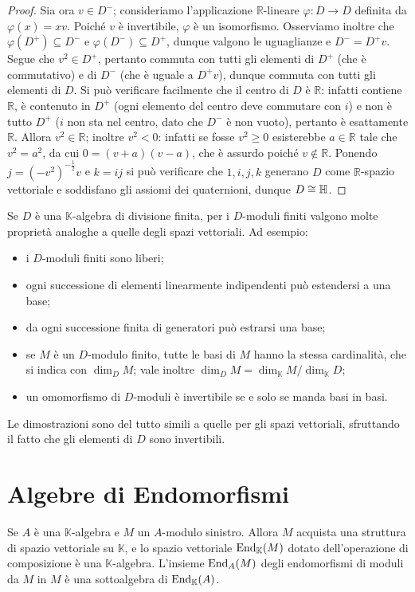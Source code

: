 \begin{proof}
Sia ora $v\in D^-$; consideriamo l'applicazione $\mathbb{R}$-lineare $\varphi:D\to D$ definita da $\varphi(x)=xv$. Poiché $v$ è invertibile, $\varphi$ è un isomorfismo. Osserviamo inoltre che $\varphi(D^+)\subseteq D^-$ e $\varphi(D^-)\subseteq D^+$, dunque valgono le uguaglianze e $D^-=D^+v$. Segue che $v^2\in D^+$, pertanto commuta con tutti gli elementi di $D^+$ (che è commutativo) e di $D^-$ (che è uguale a $D^+v$), dunque commuta con tutti gli elementi di $D$. Si può verificare facilmente che il centro di $D$ è $\mathbb{R}$: infatti contiene $\mathbb{R}$, è contenuto in $D^+$ (ogni elemento del centro deve commutare con $i$) e non è tutto $D^+$ ($i$ non sta nel centro, dato che $D^-$ è non vuoto), pertanto è esattamente $\mathbb{R}$. Allora $v^2\in\mathbb{R}$; inoltre $v^2<0$: infatti se fosse $v^2\ge 0$ esisterebbe $a\in\mathbb{R}$ tale che $v^2=a^2$, da cui $0=(v+a)(v-a)$, che è assurdo poiché $v\not\in\mathbb{R}$. Ponendo $j=(-v^2)^{-\frac{1}{2}}v$ e $k=ij$ si può verificare che $1,i,j,k$ generano $D$ come $\mathbb{R}$-spazio vettoriale e soddisfano gli assiomi dei quaternioni, dunque $D\cong\mathbb{H}$.
\end{proof}


Se $D$ è una $\mathbb{K}$-algebra di divisione finita, per i $D$-moduli finiti valgono molte proprietà analoghe a quelle degli spazi vettoriali. Ad esempio:
\begin{itemize}
\item i $D$-moduli finiti sono liberi;
\item ogni successione di elementi linearmente indipendenti può estendersi a una base;
\item da ogni successione finita di generatori può estrarsi una base;
\item se $M$ è un $D$-modulo finito, tutte le basi di $M$ hanno la stessa cardinalità, che si indica con $\dim_DM$; vale inoltre $\dim_DM=\dim_\mathbb{K}M/\dim_\mathbb{K}D$;
\item un omomorfismo di $D$-moduli è invertibile se e solo se manda basi in basi.
\end{itemize}
Le dimostrazioni sono del tutto simili a quelle per gli spazi vettoriali, sfruttando il fatto che gli elementi di $D$ sono invertibili.



\section{Algebre di Endomorfismi}


Se $A$ è una $\mathbb{K}$-algebra e $M$ un $A$-modulo sinistro. Allora $M$ acquista una struttura di spazio vettoriale su $\mathbb{K}$, e lo spazio vettoriale $\operatorname{End}_\mathbb{K}(M)$ dotato dell'operazione di composizione è una $\mathbb{K}$-algebra. L'insieme $\operatorname{End}_A(M)$ degli endomorfismi di moduli da $M$ in $M$ è una sottoalgebra di $\operatorname{End}_\mathbb{K}(A)$.


